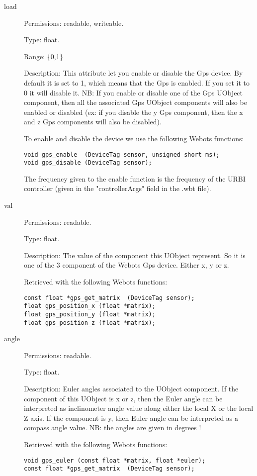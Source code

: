 \noindent
\begin{description}
\item[{load}]     Permissions: readable, writeable.


  Type: float.


  Range: \{0,1\}


  Description: This attribute let you enable or disable the Gps
  device.  By default it is set to 1, which means that the Gps is
  enabled. If you set it to 0 it will disable it. NB: If you enable or
  disable one of the Gps UObject component, then all the associated
  Gps UObject components will also be enabled or disabled (ex: if you
  disable the y Gps component, then the x and z Gps components will
  also be disabled).


  To enable and disable the device we use the following Webots
  functions:


\begin{lstlisting}
void gps_enable  (DeviceTag sensor, unsigned short ms);
void gps_disable (DeviceTag sensor);
\end{lstlisting}

The frequency given to the enable function is the frequency of the
URBI controller (given in the "controllerArgs" field in the .wbt
file).

\item[{         val
 }]            Permissions: readable.


 Type: float.


 Description: The value of the component this UObject represent. So it
 is one of the 3 component of the Webots Gps device. Either x, y or z.


 Retrieved with the following Webots functions:


\begin{lstlisting}
const float *gps_get_matrix  (DeviceTag sensor);
float gps_position_x (float *matrix);
float gps_position_y (float *matrix);
float gps_position_z (float *matrix);
\end{lstlisting}
\item[{         angle
 }]            Permissions: readable.


 Type: float.


 Description: Euler angles associated to the UObject component. If the
 component of this UObject is x or z, then the Euler angle can be
 interpreted as inclinometer angle value along either the local X or
 the local Z axis. If the component is y, then Euler angle can be
 interpreted as a compass angle value. NB: the angles are given in
 degrees !


          Retrieved with the following Webots functions:


\begin{lstlisting}
void gps_euler (const float *matrix, float *euler);
const float *gps_get_matrix  (DeviceTag sensor);
\end{lstlisting}
\end{description}

